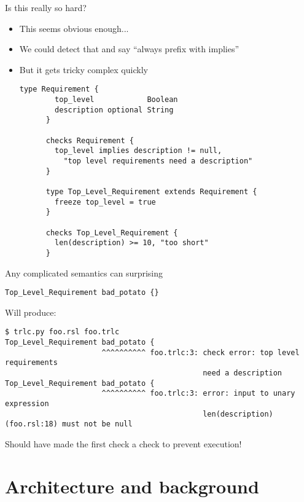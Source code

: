 \documentclass[aspectratio=169]{beamer}
\begin{document}
\begin{frame}[fragile]{Is this really so hard?}
  \begin{itemize}
  \item This seems obvious enough...
  \item We could detect that and say ``always prefix with implies''
    \pause
  \item But it gets tricky complex quickly
    \begin{lstlisting}[language=TRLC,gobble=6]
      type Requirement {
        top_level            Boolean
        description optional String
      }

      checks Requirement {
        top_level implies description != null,
          "top level requirements need a description"
      }

      type Top_Level_Requirement extends Requirement {
        freeze top_level = true
      }

      checks Top_Level_Requirement {
        len(description) >= 10, "too short"
      }
    \end{lstlisting}
  \end{itemize}
\end{frame}

\begin{frame}[fragile]{Any complicated semantics can surprising}
  \begin{lstlisting}[language=TRLC,gobble=4]
    Top_Level_Requirement bad_potato {}
  \end{lstlisting}
  Will produce:
  \begin{scriptsize}
\begin{verbatim}
$ trlc.py foo.rsl foo.trlc
Top_Level_Requirement bad_potato {
                      ^^^^^^^^^^ foo.trlc:3: check error: top level requirements
                                             need a description
Top_Level_Requirement bad_potato {
                      ^^^^^^^^^^ foo.trlc:3: error: input to unary expression
                                             len(description) (foo.rsl:18) must not be null
\end{verbatim}
  \end{scriptsize}

  \pause

  Should have made the first check a  check to
  prevent execution!
\end{frame}

\section{Architecture and background}
\end{document}
